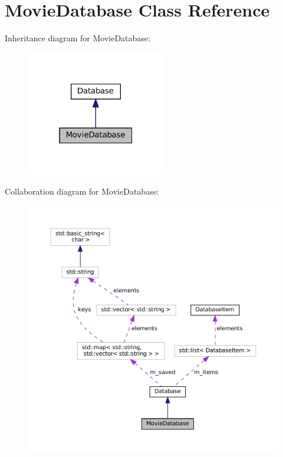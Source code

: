 \hypertarget{classMovieDatabase}{}\section{Movie\+Database Class Reference}
\label{classMovieDatabase}


Inheritance diagram for Movie\+Database\+:
\nopagebreak
\begin{figure}[H]
\begin{center}
\leavevmode
\includegraphics[width=172pt]{classMovieDatabase__inherit__graph}
\end{center}
\end{figure}


Collaboration diagram for Movie\+Database\+:
\nopagebreak
\begin{figure}[H]
\begin{center}
\leavevmode
\includegraphics[width=350pt]{classMovieDatabase__coll__graph}
\end{center}
\end{figure}
